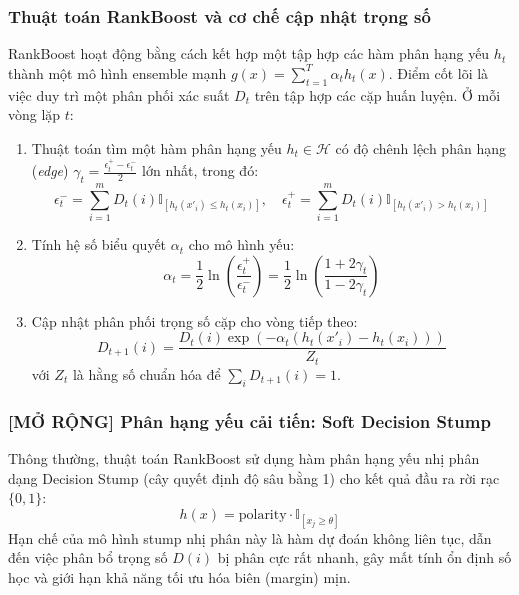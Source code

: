 \subsubsection{Thuật toán RankBoost và cơ chế cập nhật trọng số}
RankBoost hoạt động bằng cách kết hợp một tập hợp các hàm phân hạng yếu $h_t$ thành một mô hình ensemble mạnh $g(x) = \sum_{t=1}^T \alpha_t h_t(x)$. Điểm cốt lõi là việc duy trì một phân phối xác suất $D_t$ trên tập hợp các cặp huấn luyện. Ở mỗi vòng lặp $t$:
\begin{enumerate}
    \item Thuật toán tìm một hàm phân hạng yếu $h_t \in \mathcal{H}$ có độ chênh lệch phân hạng (\textit{edge}) $\gamma_t = \frac{\epsilon^+_t - \epsilon^-_t}{2}$ lớn nhất, trong đó:
    \begin{equation}
        \epsilon^-_t = \sum_{i=1}^m D_t(i) \mathbb{I}_{[h_t(x'_{i}) \le h_t(x_i)]}, \quad \epsilon^+_t = \sum_{i=1}^m D_t(i) \mathbb{I}_{[h_t(x'_{i}) > h_t(x_i)]}
    \end{equation}
    \item Tính hệ số biểu quyết $\alpha_t$ cho mô hình yếu:
    \begin{equation}
        \alpha_t = \frac{1}{2} \ln\left(\frac{\epsilon^+_t}{\epsilon^-_t}\right) = \frac{1}{2} \ln\left(\frac{1 + 2\gamma_t}{1 - 2\gamma_t}\right)
    \end{equation}
    \item Cập nhật phân phối trọng số cặp cho vòng tiếp theo:
    \begin{equation}
        D_{t+1}(i) = \frac{D_t(i) \exp(-\alpha_t (h_t(x'_{i}) - h_t(x_i)))}{Z_t}
    \end{equation}
    với $Z_t$ là hằng số chuẩn hóa để $\sum_i D_{t+1}(i) = 1$.
\end{enumerate}

\subsubsection{[MỞ RỘNG] Phân hạng yếu cải tiến: Soft Decision Stump}
Thông thường, thuật toán RankBoost sử dụng hàm phân hạng yếu nhị phân dạng Decision Stump (cây quyết định độ sâu bằng 1) cho kết quả đầu ra rời rạc $\{0, 1\}$:
\begin{equation}
    h(x) = \text{polarity} \cdot \mathbb{I}_{[x_j \ge \theta]}
\end{equation}
Hạn chế của mô hình stump nhị phân này là hàm dự đoán không liên tục, dẫn đến việc phân bổ trọng số $D(i)$ bị phân cực rất nhanh, gây mất tính ổn định số học và giới hạn khả năng tối ưu hóa biên (margin) mịn.

